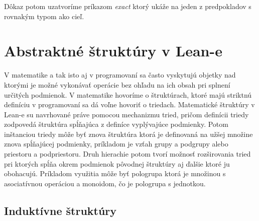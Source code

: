 \documentclass[a4paper,10pt,oneside]{report}%
\begin{document}
Dôkaz potom uzatvoríme príkazom \emph{exact} ktorý ukáže na jeden z predpokladov
    s rovnakým typom ako cieľ.

\section{Abstraktné štruktúry v Lean-e}
    V matematike a tak isto aj v programovaní sa často vyskytujú objetky
nad ktorými je možné vykonávať operácie bez ohľadu na ich obsah pri splnení
určitých podmienok.
    V matematike hovoríme o štruktúrach, ktoré majú striktnú definíciu v programovaní
sa dá voľne hovoriť o triedach.
    Matematické štruktúry v Lean-e su navrhované práve pomocou mechanizmu tried,
pričom definícii triedy zodpovedá štruktúra spĺňajúca z definíce vyplývajúce podmienky.
    Potom inštanciou triedy môže byť znova štruktúra ktorá je definovaná na užšej množine
znova spĺňajúcej podmienky, príkladom je vzťah grupy a podgrupy alebo
priestoru a podpriestoru.
    Druh hierachie potom tvorí možnosť rozširovania tried pri ktorých spĺňa okrem
podmienok pôvodnej štruktúry aj ďalšie ktoré ju obohacujú.
    Príkladom využitia môže byť pologrupa ktorá je množinou s asociatívnou operáciou
a monoidom, čo je pologrupa s jednotkou.
\subsection{Induktívne štruktúry}
\end{document}
